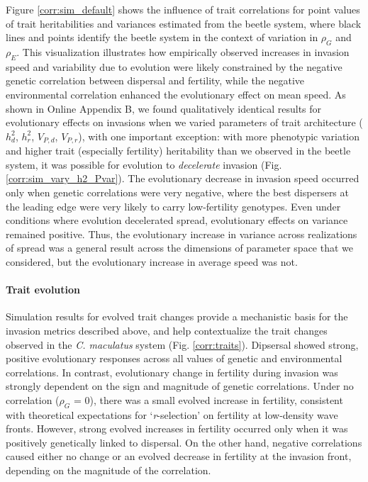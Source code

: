 \documentclass[11pt]{article}
\begin{document}
Figure \ref{corr:sim_default} shows the influence of trait correlations for point values of trait heritabilities and variances estimated from the beetle system, where black lines and points identify the beetle system in the context of variation in $\rho_{G}$ and $\rho_{E}$.
This visualization illustrates how empirically observed increases in invasion speed and variability due to evolution were likely constrained by the negative genetic correlation between dispersal and fertility, while the negative environmental correlation enhanced the evolutionary effect on mean speed.
As shown in Online Appendix B, we found qualitatively identical results for evolutionary effects on invasions when we varied parameters of trait architecture ($h^{2}_d$, $h^{2}_r$, $V_{P,d}$, $V_{P,r}$), with one important exception: with more phenotypic variation and higher trait (especially fertility) heritability than we observed in the beetle system, it was possible for evolution to \textit{decelerate} invasion (Fig. \ref{corr:sim_vary_h2_Pvar}).
The evolutionary decrease in invasion speed occurred only when genetic correlations were very negative, where the best dispersers at the leading edge were very likely to carry low-fertility genotypes.
Even under conditions where evolution decelerated spread, evolutionary effects on variance remained positive.
Thus, the evolutionary increase in variance across realizations of spread was a general result across the dimensions of parameter space that we considered, but the evolutionary increase in average speed was not.

\paragraph{Trait evolution}
Simulation results for evolved trait changes provide a mechanistic basis for the invasion metrics described above, and help contextualize the trait changes observed in the \textit{C. maculatus} system (Fig. \ref{corr:traits}).
Dipsersal showed strong, positive evolutionary responses across all values of genetic and environmental correlations.
In contrast, evolutionary change in fertility during invasion was strongly dependent on the sign and magnitude of genetic correlations.
Under no correlation ($\rho_{G}$ = 0), there was a small evolved increase in fertility, consistent with theoretical expectations for `\textit{r}-selection’ on fertility at low-density wave fronts.
However, strong evolved increases in fertility occurred only when it was positively genetically linked to dispersal.
On the other hand, negative correlations caused either no change or an evolved decrease in fertility at the invasion front, depending on the magnitude of the correlation.
\end{document}
